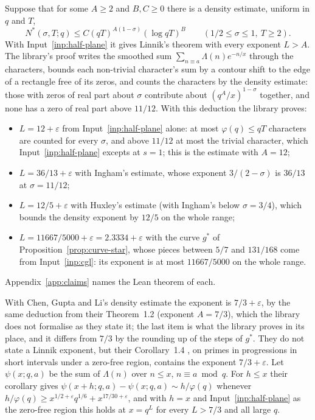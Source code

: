 \documentclass[11pt]{article}
\theoremstyle{definition}
\begin{document}
Suppose that for some $A \ge 2$ and $B, C \ge 0$ there is a density estimate, uniform in $q$ and $T$,
\[
  N^*(\sigma, T; q) \le C (qT)^{A(1 - \sigma)} (\log qT)^B \qquad (1/2 \le \sigma \le 1,\ T \ge 2).
\]
With Input~\ref{inp:half-plane} it gives Linnik's theorem with every exponent $L > A$. The library's proof writes the
smoothed sum $\sum_{n \equiv a} \Lambda(n) e^{-n/x}$ through the characters, bounds each non-trivial character's sum by
a contour shift to the edge of a rectangle free of its zeros, and counts the characters by the density estimate: those
with zeros of real part about $\sigma$ contribute about $(q^A/x)^{1 - \sigma}$ together, and none has a zero of real
part above $11/12$. With this deduction the library proves:
\begin{itemize}
\item $L = 12 + \varepsilon$ from Input~\ref{inp:half-plane} alone: at most $\varphi(q) \le qT$ characters are
  counted for every $\sigma$, and above $11/12$ at most the trivial character, which Input~\ref{inp:half-plane}
  excepts at $s = 1$; this is the estimate with $A = 12$;
\item $L = 36/13 + \varepsilon$ with Ingham's estimate, whose exponent $3/(2 - \sigma)$ is $36/13$ at
  $\sigma = 11/12$;
\item $L = 12/5 + \varepsilon$ with Huxley's estimate (with Ingham's below $\sigma = 3/4$), which bounds the density
  exponent by $12/5$ on the whole range;
\item $L = 11667/5000 + \varepsilon = 2.3334 + \varepsilon$ with the curve $g^*$ of Proposition~\ref{prop:curve-star},
  whose pieces between $5/7$ and $131/168$ come from Input~\ref{inp:cgl}: its exponent is at most $11667/5000$ on the
  whole range.
\end{itemize}
Appendix~\ref{app:claims} names the Lean theorem of each.

With Chen, Gupta and Li's density estimate the exponent is
$7/3 + \varepsilon$, by the same deduction from their Theorem~1.2 \cite{cgl} (exponent $A = 7/3$), which the library
does not formalise as they state it; the last item is what the library proves in its place, and it differs from $7/3$
by the rounding up of the steps of $g^*$. They do not state a Linnik exponent, but their Corollary~1.4 \cite{cgl}, on
primes in progressions in short intervals under a zero-free region, contains the exponent $7/3 + \varepsilon$. Let
$\psi(x; q, a)$ be the sum of $\Lambda(n)$ over $n \le x$, $n \equiv a \bmod q$. For $h \le x$ their corollary gives
$\psi(x + h; q, a) - \psi(x; q, a) \sim h/\varphi(q)$ whenever
$h/\varphi(q) \ge x^{1/2 + \varepsilon} q^{1/6} + x^{17/30 + \varepsilon}$, and with $h = x$ and
Input~\ref{inp:half-plane} as the zero-free region this holds at $x = q^L$ for every $L > 7/3$ and all large $q$.
\end{document}
